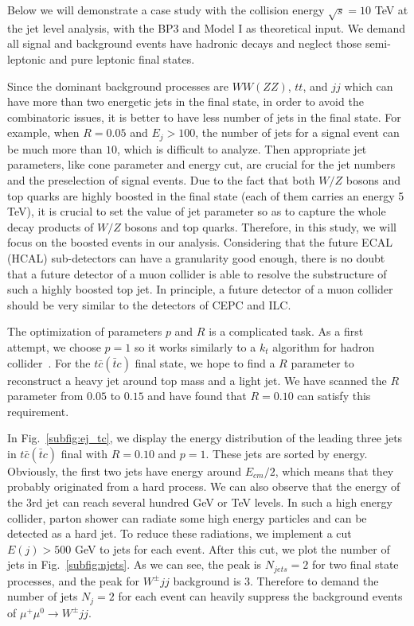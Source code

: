\documentclass[a4paper,11pt]{article}
\begin{document}
Below we will demonstrate a case study with the collision energy $\sqrt{s}=10$ TeV at the jet level analysis, 
with the BP3 and Model I as theoretical input. 
We demand all signal and background events have hadronic decays and neglect those semi-leptonic and pure leptonic final states. 

Since the dominant background processes are $WW (ZZ)$, $tt$, 
and $jj$ which can have more than two energetic jets in the final state, 
in order to avoid the combinatoric issues, it is better to have less number of jets in the final state. 
For example, when $R=0.05$ and $E_j>100$,
the number of jets for a signal event can be much more than $10$, which is difficult to analyze. 
Then appropriate jet parameters, like cone parameter and energy cut, 
are crucial for the jet numbers and the preselection of signal events. 
Due to the fact that both $W/Z$ bosons and top quarks are highly boosted in the final state 
(each of them carries an energy 5 TeV), 
it is crucial to set the value of jet parameter so as to capture the whole decay products of $W/Z$ bosons and top quarks. Therefore, in this study, we will focus on the boosted events in our analysis. Considering that the future ECAL (HCAL) sub-detectors can have a granularity good enough,  there is no doubt that a future detector of a muon collider is able to resolve the substructure of such a highly boosted top jet. In principle, a future detector of a muon collider should be very similar to the detectors of CEPC and ILC.

The optimization of parameters $p$ and $R$ is a complicated task.
As a first attempt, we choose $p=1$ so it works similarly to a $k_t$ algorithm for hadron collider~\cite{Catani:1993hr,Ellis:1993tq}. 
For the $t\bar{c}(\bar{t}c)$ final state, we hope to find a $R$ parameter to reconstruct a heavy jet around top mass and a light jet.
We have scanned the $R$ parameter from $0.05$ to $0.15$ and have found that $R=0.10$ can satisfy this requirement. 

In Fig.~\ref{subfig:ej_tc}, we display the energy distribution of the leading three jets in $t\bar{c}(\bar{t}c)$ final with $R=0.10$ and $p=1$. 
These jets are sorted by energy.  Obviously, the first two jets have energy around $E_{cm}/2$, 
which means that they probably originated from a hard process.
We can also observe that the energy of the 3rd jet can reach several hundred GeV or TeV levels.
In such a high energy collider, parton shower can radiate some high energy particles and can be detected as a hard jet. To reduce these radiations, we implement a cut $E(j)>500$ GeV to jets for each event. 
After this cut, we plot the number of jets in Fig.~\ref{subfig:njets}. 
As we can see, the peak is $N_{jets}=2$ for two final state processes, and the peak for $W^{\pm}jj$ background is 3.  Therefore to demand the number of jets $N_j=2$ for each event can heavily suppress the background events of $\mu^+ \mu^0 \to W^{\pm}jj$.
\end{document}

